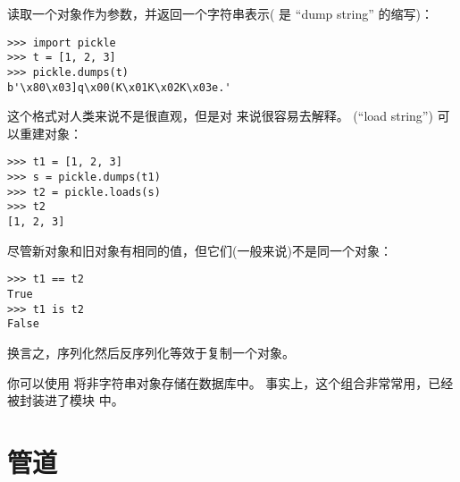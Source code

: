 {{{{{{{ 读取一个对象作为参数，并返回一个字符串表示(  是 ``dump string'' 的缩写)：

\begin{lstlisting}
>>> import pickle
>>> t = [1, 2, 3]
>>> pickle.dumps(t)
b'\x80\x03]q\x00(K\x01K\x02K\x03e.'
\end{lstlisting}

%

这个格式对人类来说不是很直观，但是对  来说很容易去解释。  (``load string'') 可以重建对象：

\begin{lstlisting}
>>> t1 = [1, 2, 3]
>>> s = pickle.dumps(t1)
>>> t2 = pickle.loads(s)
>>> t2
[1, 2, 3]
\end{lstlisting}

%

尽管新对象和旧对象有相同的值，但它们(一般来说)不是同一个对象：

\begin{lstlisting}
>>> t1 == t2
True
>>> t1 is t2
False
\end{lstlisting}

%

换言之，序列化然后反序列化等效于复制一个对象。


你可以使用  将非字符串对象存储在数据库中。
事实上，这个组合非常常用，已经被封装进了模块  中。

  

\section{管道}
  


}}}}}}}
